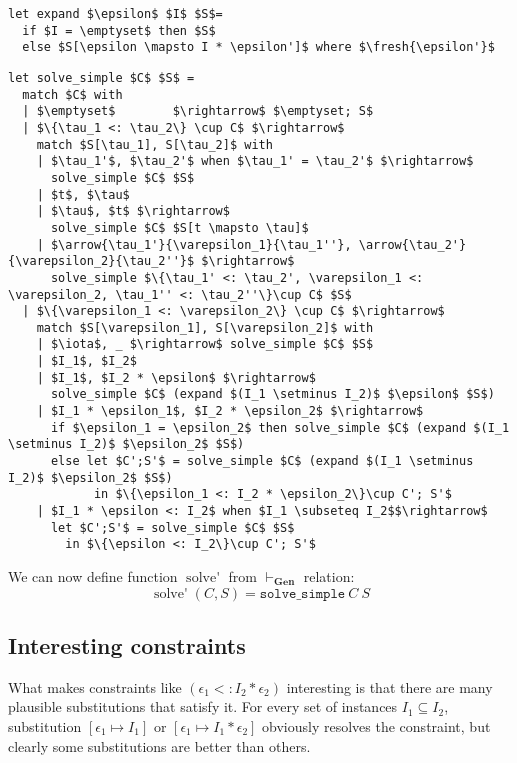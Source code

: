 \documentclass[declaration,shortabstract]{iithesis}
\theoremstyle{definition} \newtheorem{definition}{Definition}[section]
\newcommand{\arrow}[3]{{#1}\rightarrow_{#2}{#3}}
\newcommand{\fresh}[1]{\ensuremath{\operatorname{fresh}({#1})}}
\begin{document}
\begin{lstlisting}
let expand $\epsilon$ $I$ $S$= 
  if $I = \emptyset$ then $S$
  else $S[\epsilon \mapsto I * \epsilon']$ where $\fresh{\epsilon'}$
\end{lstlisting}
\begin{lstlisting}
let solve_simple $C$ $S$ = 
  match $C$ with
  | $\emptyset$        $\rightarrow$ $\emptyset; S$
  | $\{\tau_1 <: \tau_2\} \cup C$ $\rightarrow$
    match $S[\tau_1], S[\tau_2]$ with
    | $\tau_1'$, $\tau_2'$ when $\tau_1' = \tau_2'$ $\rightarrow$
      solve_simple $C$ $S$
    | $t$, $\tau$
    | $\tau$, $t$ $\rightarrow$
      solve_simple $C$ $S[t \mapsto \tau]$
    | $\arrow{\tau_1'}{\varepsilon_1}{\tau_1''}, \arrow{\tau_2'}{\varepsilon_2}{\tau_2''}$ $\rightarrow$
      solve_simple $\{\tau_1' <: \tau_2', \varepsilon_1 <: \varepsilon_2, \tau_1'' <: \tau_2''\}\cup C$ $S$
  | $\{\varepsilon_1 <: \varepsilon_2\} \cup C$ $\rightarrow$
    match $S[\varepsilon_1], S[\varepsilon_2]$ with
    | $\iota$, _ $\rightarrow$ solve_simple $C$ $S$
    | $I_1$, $I_2$ 
    | $I_1$, $I_2 * \epsilon$ $\rightarrow$
      solve_simple $C$ (expand $(I_1 \setminus I_2)$ $\epsilon$ $S$)
    | $I_1 * \epsilon_1$, $I_2 * \epsilon_2$ $\rightarrow$
      if $\epsilon_1 = \epsilon_2$ then solve_simple $C$ (expand $(I_1 \setminus I_2)$ $\epsilon_2$ $S$)
      else let $C';S'$ = solve_simple $C$ (expand $(I_1 \setminus I_2)$ $\epsilon_2$ $S$) 
            in $\{\epsilon_1 <: I_2 * \epsilon_2\}\cup C'; S'$
    | $I_1 * \epsilon <: I_2$ when $I_1 \subseteq I_2$$\rightarrow$
      let $C';S'$ = solve_simple $C$ $S$ 
        in $\{\epsilon <: I_2\}\cup C'; S'$
\end{lstlisting}

We can now define function $\operatorname{solve'}$ from $ \vdash_\textbf{Gen} $ relation:
$$ \operatorname{solve'}(C, S) = \texttt{solve\_simple}\:C\:S $$ 

\subsection{Interesting constraints}
What makes constraints like $(\epsilon_1 <: I_2 * \epsilon_2)$ interesting is that there are many
plausible substitutions that satisfy it.
For every set of instances $I_1 \subseteq I_2$, substitution $[\epsilon_1 \mapsto I_1]$ or 
$[\epsilon_1 \mapsto I_1 * \epsilon_2]$ obviously resolves the constraint, but clearly some substitutions are better than others. 
\end{document}

